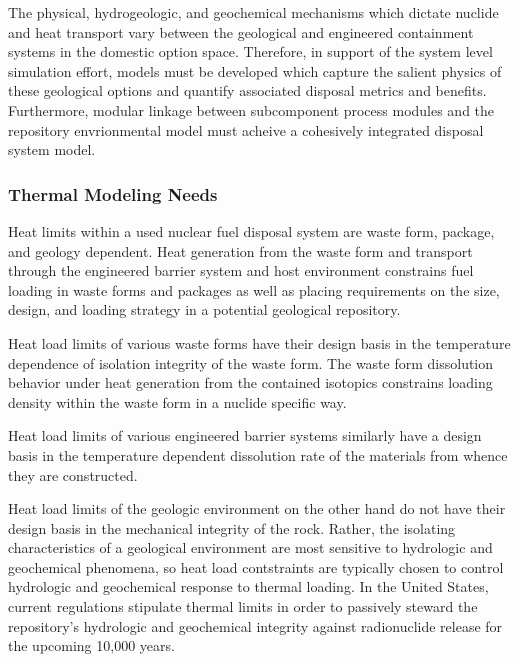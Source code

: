 The physical, hydrogeologic, and geochemical mechanisms which dictate 
nuclide and heat transport vary between the geological and engineered 
containment systems in the domestic option space.  Therefore, in 
support of the system level simulation effort, models must be 
developed which capture the salient physics of these geological 
options and quantify associated disposal metrics and benefits.  
Furthermore, modular linkage between subcomponent process modules and 
the repository envrionmental model must acheive a cohesively 
integrated disposal system model. 


\subsubsection{Thermal Modeling Needs}
Heat limits within a used nuclear fuel disposal system are waste form, 
package, and geology dependent. Heat generation from the waste form 
and transport through the engineered barrier system and host 
environment constrains fuel loading in waste forms and packages as 
well as placing requirements on the size, design, and loading strategy 
in a potential geological repository.

Heat load limits of various waste forms have their design basis in the 
temperature dependence of isolation integrity of the waste form. The 
waste form dissolution behavior under heat generation from the 
contained isotopics constrains loading density within the waste form 
in a nuclide specific way.  

Heat load limits of various engineered barrier systems similarly have 
a design basis in the temperature dependent dissolution rate of the 
materials from whence they are constructed.  

Heat load limits of the geologic environment on the other hand do not  
have their design basis in the mechanical integrity of the rock.  
Rather, the isolating characteristics of a geological environment are 
most sensitive to hydrologic and geochemical phenomena, so heat load 
contstraints are typically chosen to control hydrologic and 
geochemical response to thermal loading. In the United States, current 
regulations stipulate thermal limits in order to passively steward the 
repository's hydrologic and geochemical integrity against radionuclide  
release for the upcoming 10,000 years.

